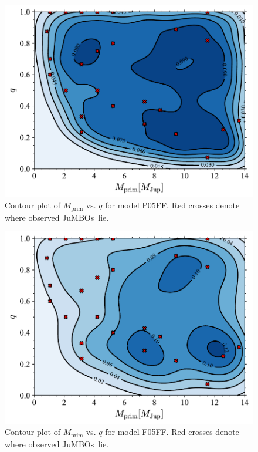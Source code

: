 \documentclass[aa]{lib/aa}
\newcommand{\jumbos}{\mbox{JuMBOs}}
\begin{document}
   \begin{figure}
    \centering
        \includegraphics[width=\columnwidth]{figures/Plummer_rvir0.5_FF_mass_distr.pdf}
        \caption{Contour plot of $M_{\mathrm{prim}}$ vs. $q$ for model P05FF. Red crosses denote where observed \jumbos\, lie.}
         \label{Fig:Gen_mdistr_Plummer}
   \end{figure}
   
   \begin{figure}
    \centering
        \includegraphics[width=\columnwidth]{figures/Fractal_rvir0.5_FF_mass_distr.pdf}
        \caption{Contour plot of $M_{\mathrm{prim}}$ vs. $q$ for model F05FF. Red crosses denote where observed \jumbos\, lie.}
         \label{Fig:Gen_mdistr_Fractal}
   \end{figure}
\end{document}
